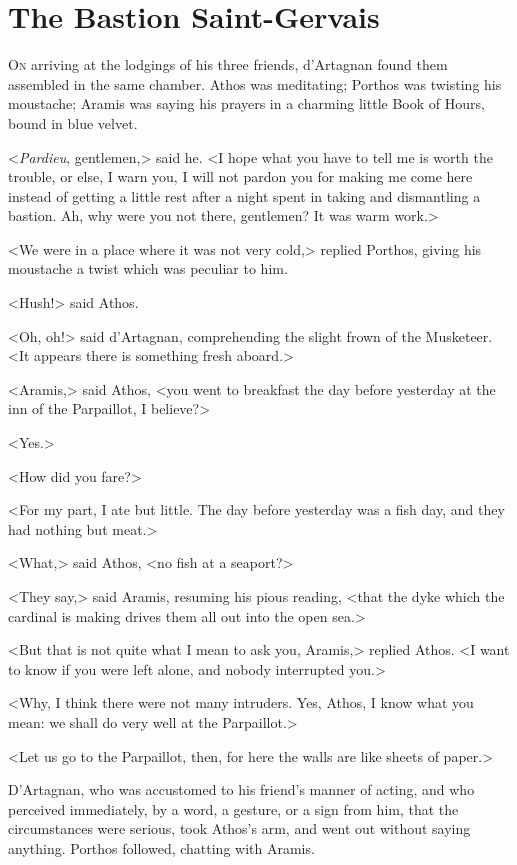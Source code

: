 
\chapter{The Bastion Saint-Gervais}

\lettrine[]{O}{n} arriving at the lodgings of his three friends, d'Artagnan found them assembled in the same chamber. Athos was meditating; Porthos was twisting his moustache; Aramis was saying his prayers in a charming little Book of Hours, bound in blue velvet. 

<\textit{Pardieu}, gentlemen,> said he. <I hope what you have to tell me is worth the trouble, or else, I warn you, I will not pardon you for making me come here instead of getting a little rest after a night spent in taking and dismantling a bastion. Ah, why were you not there, gentlemen? It was warm work.> 

<We were in a place where it was not very cold,> replied Porthos, giving his moustache a twist which was peculiar to him. 

<Hush!> said Athos. 

<Oh, oh!> said d'Artagnan, comprehending the slight frown of the Musketeer. <It appears there is something fresh aboard.> 

<Aramis,> said Athos, <you went to breakfast the day before yesterday at the inn of the Parpaillot, I believe?> 

<Yes.> 

<How did you fare?> 

<For my part, I ate but little. The day before yesterday was a fish day, and they had nothing but meat.> 

<What,> said Athos, <no fish at a seaport?> 

<They say,> said Aramis, resuming his pious reading, <that the dyke which the cardinal is making drives them all out into the open sea.> 

<But that is not quite what I mean to ask you, Aramis,> replied Athos. <I want to know if you were left alone, and nobody interrupted you.> 

<Why, I think there were not many intruders. Yes, Athos, I know what you mean: we shall do very well at the Parpaillot.> 

<Let us go to the Parpaillot, then, for here the walls are like sheets of paper.> 

D'Artagnan, who was accustomed to his friend's manner of acting, and who perceived immediately, by a word, a gesture, or a sign from him, that the circumstances were serious, took Athos's arm, and went out without saying anything. Porthos followed, chatting with Aramis. 

